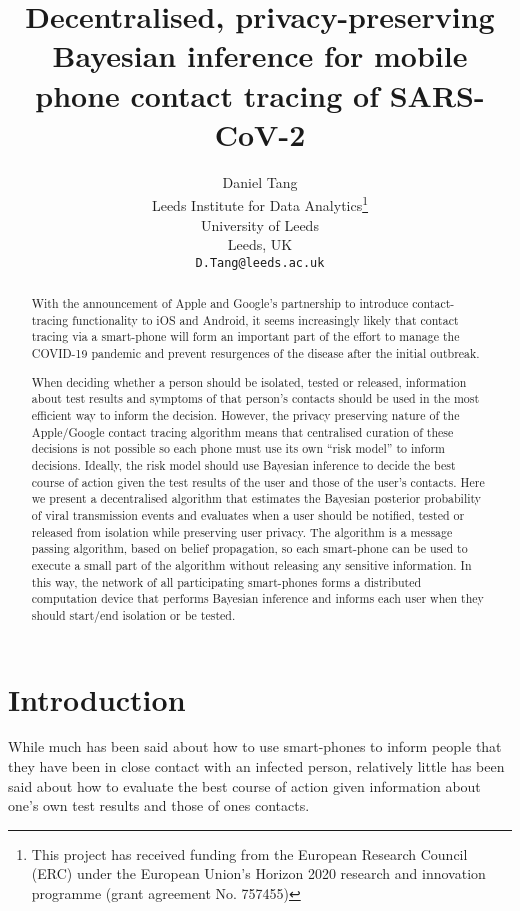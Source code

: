 \documentclass{article}
\title{Decentralised, privacy-preserving Bayesian inference for mobile phone contact tracing of SARS-CoV-2}
\author{
  Daniel Tang\\
  Leeds Institute for Data Analytics\thanks{This project has received funding from the European Research Council (ERC) under the European Union’s Horizon 2020 research and innovation programme (grant agreement No. 757455)}\\
  University of Leeds\\
  Leeds, UK\\
  \texttt{D.Tang@leeds.ac.uk} \\
}
\begin{document}
\maketitle

\begin{abstract}
With the announcement of Apple and Google's partnership to introduce contact-tracing functionality to iOS and Android, it seems increasingly likely that contact tracing via a smart-phone will form an important part of the effort to manage the COVID-19 pandemic and prevent resurgences of the disease after the initial outbreak.

When deciding whether a person should be isolated, tested or released, information about test results and symptoms of that person's contacts should be used in the most efficient way to inform the decision. However, the privacy preserving nature of the Apple/Google contact tracing algorithm means that centralised curation of these decisions is not possible so each phone must use its own ``risk model'' to inform decisions. Ideally, the risk model should use Bayesian inference to decide the best course of action given the test results of the user and those of the user's contacts. Here we present a decentralised algorithm that estimates the Bayesian posterior probability of viral transmission events and evaluates when a user should be notified, tested or released from isolation while preserving user privacy. The algorithm is a message passing algorithm, based on belief propagation, so each smart-phone can be used to execute a small part of the algorithm without releasing any sensitive information. In this way, the network of all participating smart-phones forms a distributed computation device that performs Bayesian inference and informs each user when they should start/end isolation or be tested. 

\end{abstract}


\section{Introduction}

While much has been said about how to use smart-phones to inform people that they have been in close contact with an infected person, relatively little has been said about how to evaluate the best course of action given information about one's own test results and those of ones contacts.
\end{document}
